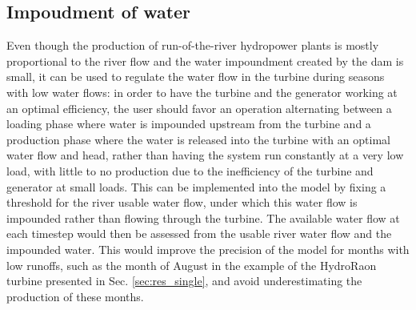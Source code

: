 \subsection{Impoudment of water}
\label{sub:impoudment}
Even though the production of run-of-the-river hydropower plants is mostly proportional to the river flow and the water impoundment created by the dam is small, it can be used to regulate the water flow in the turbine during seasons with low water flows: in order to have the turbine and the generator working at an optimal efficiency, the user should favor an operation alternating between a loading phase where water is impounded upstream from the turbine and a production phase where the water is released into the turbine with an optimal water flow and head, rather than having the system run constantly at a very low load, with little to no production due to the inefficiency of the turbine and generator at small loads. \newline
This can be implemented into the model by fixing a threshold for the river usable water flow, under which this water flow is impounded rather than flowing through the turbine. The available water flow at each timestep would then be assessed from the usable river water flow and the impounded water. This would improve the precision of the model for months with low runoffs, such as the month of August in the example of the HydroRaon turbine presented in Sec. \ref{sec:res_single}, and avoid underestimating the production of these months.
